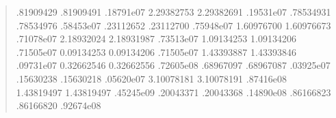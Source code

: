 \documentclass[letterpaper,10pt,english]{sphinxmanual}
\begin{document}
\begin{enumerate}
\begin{quote}
\begin{sphinxVerbatim}[commandchars=\\\{\}]
     .81909429           .81909491  .18791e\PYGZhy{}07 
    \PYGZhy{}2.29382753          \PYGZhy{}2.29382691  .19531e\PYGZhy{}07 
     .78534931           .78534976  .58453e\PYGZhy{}07 
     .23112652           .23112700  .75948e\PYGZhy{}07 
    \PYGZhy{}1.60976700          \PYGZhy{}1.60976673  .71078e\PYGZhy{}07 
    \PYGZhy{}2.18932024          \PYGZhy{}2.18931987  .73513e\PYGZhy{}07 
    \PYGZhy{}1.09134253          \PYGZhy{}1.09134206  .71505e\PYGZhy{}07 
    \PYGZhy{}0.09134253          \PYGZhy{}0.09134206  .71505e\PYGZhy{}07 
    \PYGZhy{}1.43393887          \PYGZhy{}1.43393846  .09731e\PYGZhy{}07 
    \PYGZhy{}0.32662546          \PYGZhy{}0.32662556  .72605e\PYGZhy{}08 
     .68967097           .68967087  .03925e\PYGZhy{}07 
     .15630238           .15630218  .05620e\PYGZhy{}07 
    \PYGZhy{}3.10078181          \PYGZhy{}3.10078191  .87416e\PYGZhy{}08 
    \PYGZhy{}1.43819497          \PYGZhy{}1.43819497  .45245e\PYGZhy{}09 
     .20043371           .20043368  .14890e\PYGZhy{}08 
     .86166823           .86166820  .92674e\PYGZhy{}08 

\end{sphinxVerbatim}
\end{quote}
\end{enumerate}
\end{document}
